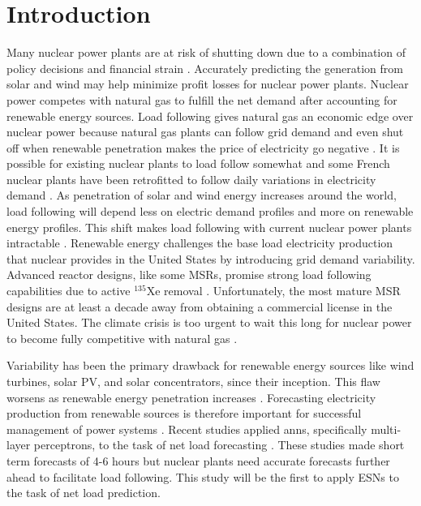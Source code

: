 \section{Introduction}

Many nuclear power plants are at risk of shutting down due to a combination of
policy decisions and financial strain \cite{clemmer_nuclear_2018}. Accurately
predicting the generation from solar and wind may help minimize profit losses 
for nuclear power plants. Nuclear
power competes with natural gas to fulfill the net demand after accounting for
renewable energy sources. Load following gives natural
gas an economic edge over nuclear power because natural gas plants can follow
grid demand and even shut off when renewable penetration makes the
price of electricity go negative \cite{keppler_carbon_2011}. It is possible for
existing nuclear plants to load follow somewhat and some French nuclear
plants have been retrofitted to follow daily variations in electricity demand
\cite{lokhov_technical_2011}. As penetration of solar
and wind energy increases around the world, load following will depend less on
electric demand profiles and more on renewable energy profiles. This shift makes
load following with current nuclear power plants intractable
\cite{cany_nuclear_2018}.
Renewable energy challenges the base load electricity production that
nuclear provides in the United States by introducing grid demand variability.
Advanced reactor designs, like some \glspl{MSR}, promise strong load following
capabilities due to active $^{135}$Xe removal \cite{rykhlevskii_impact_2019}.
Unfortunately, the most mature MSR
designs are at least a decade away from obtaining a commercial license in the
United States. The climate crisis is too urgent to wait this long for nuclear
power to become fully competitive with natural gas
\cite{intergovernmental_panel_on_climate_change_climate_2014}.

Variability has been the primary drawback for renewable energy sources like
wind turbines, solar PV, and solar concentrators, since their inception. This
flaw worsens as renewable energy penetration increases
\cite{cany_nuclear_2018}. Forecasting electricity production from
renewable sources is therefore important for successful management of power
systems \cite{kobylinski_high-resolution_2020}. Recent studies applied
\glspl{ann}, specifically multi-layer perceptrons, to the task of net load
forecasting \cite{kobylinski_high-resolution_2020,dutta_load_2017,lee_development_2016}.
These studies made short term forecasts of 4-6 hours but nuclear plants
need accurate forecasts further ahead to facilitate load following.
This study will be the first to apply \glspl{ESN} to the task of net load
prediction.
